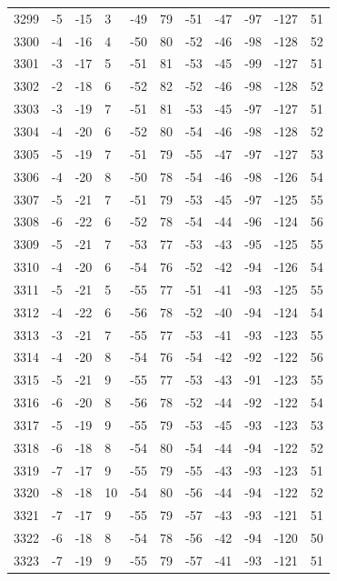 \begin{table}[H]
\begin{tabular}{lllllllllll}
3299 & -5 & -15 & 3 & -49 & 79 & -51 & -47 & -97 & -127 & 51 \\
3300 & -4 & -16 & 4 & -50 & 80 & -52 & -46 & -98 & -128 & 52 \\
3301 & -3 & -17 & 5 & -51 & 81 & -53 & -45 & -99 & -127 & 51 \\
3302 & -2 & -18 & 6 & -52 & 82 & -52 & -46 & -98 & -128 & 52 \\
3303 & -3 & -19 & 7 & -51 & 81 & -53 & -45 & -97 & -127 & 51 \\
3304 & -4 & -20 & 6 & -52 & 80 & -54 & -46 & -98 & -128 & 52 \\
3305 & -5 & -19 & 7 & -51 & 79 & -55 & -47 & -97 & -127 & 53 \\
3306 & -4 & -20 & 8 & -50 & 78 & -54 & -46 & -98 & -126 & 54 \\
3307 & -5 & -21 & 7 & -51 & 79 & -53 & -45 & -97 & -125 & 55 \\
3308 & -6 & -22 & 6 & -52 & 78 & -54 & -44 & -96 & -124 & 56 \\
3309 & -5 & -21 & 7 & -53 & 77 & -53 & -43 & -95 & -125 & 55 \\
3310 & -4 & -20 & 6 & -54 & 76 & -52 & -42 & -94 & -126 & 54 \\
3311 & -5 & -21 & 5 & -55 & 77 & -51 & -41 & -93 & -125 & 55 \\
3312 & -4 & -22 & 6 & -56 & 78 & -52 & -40 & -94 & -124 & 54 \\
3313 & -3 & -21 & 7 & -55 & 77 & -53 & -41 & -93 & -123 & 55 \\
3314 & -4 & -20 & 8 & -54 & 76 & -54 & -42 & -92 & -122 & 56 \\
3315 & -5 & -21 & 9 & -55 & 77 & -53 & -43 & -91 & -123 & 55 \\
3316 & -6 & -20 & 8 & -56 & 78 & -52 & -44 & -92 & -122 & 54 \\
3317 & -5 & -19 & 9 & -55 & 79 & -53 & -45 & -93 & -123 & 53 \\
3318 & -6 & -18 & 8 & -54 & 80 & -54 & -44 & -94 & -122 & 52 \\
3319 & -7 & -17 & 9 & -55 & 79 & -55 & -43 & -93 & -123 & 51 \\
3320 & -8 & -18 & 10 & -54 & 80 & -56 & -44 & -94 & -122 & 52 \\
3321 & -7 & -17 & 9 & -55 & 79 & -57 & -43 & -93 & -121 & 51 \\
3322 & -6 & -18 & 8 & -54 & 78 & -56 & -42 & -94 & -120 & 50 \\
3323 & -7 & -19 & 9 & -55 & 79 & -57 & -41 & -93 & -121 & 51 \\

\end{tabular}
\end{table}
